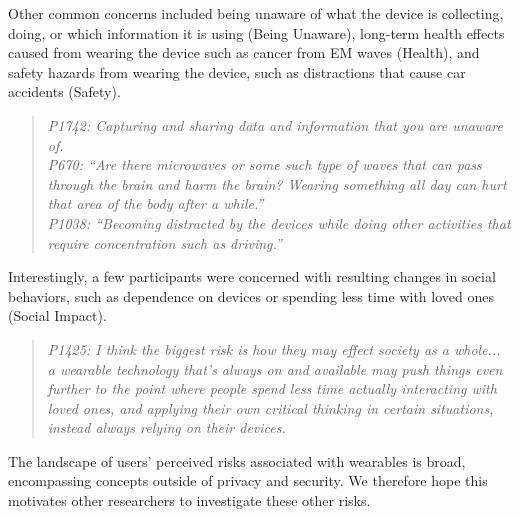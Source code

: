 \documentclass[conference]{IEEEtran}
\begin{document}
Other common concerns included being unaware of what the device is collecting, doing, or which information it is using (Being Unaware), long-term health effects caused from wearing the device such as cancer from EM waves (Health), and safety hazards from wearing the device, such as distractions that cause car accidents (Safety).

\begin{quotation}
\noindent
\textit{P1742: Capturing and sharing data and information that you are unaware of.}\\

\noindent
\textit{P670: ``Are there microwaves or some such type of waves that can pass through the brain and harm the brain?  Wearing something all day can hurt that area of the body after a while.''}\\

\noindent
\textit{P1038: ``Becoming distracted by the devices while doing other activities that require concentration such as driving.''}

\end{quotation}

Interestingly, a few participants were concerned with resulting changes in social behaviors, such as dependence on devices or spending less time with loved ones (Social Impact). 

\begin{quotation}
\noindent
\textit{P1425: I think the biggest risk is how they may effect society as a whole... a wearable technology that's always on and available may push things even further to the point where people spend less time actually interacting with loved ones, and applying their own critical thinking in certain situations, instead always relying on their devices.}
\end{quotation}

The landscape of users' perceived risks associated with wearables is broad, encompassing concepts outside of privacy and security. We therefore hope this motivates other researchers to investigate these other risks. 
\end{document}
